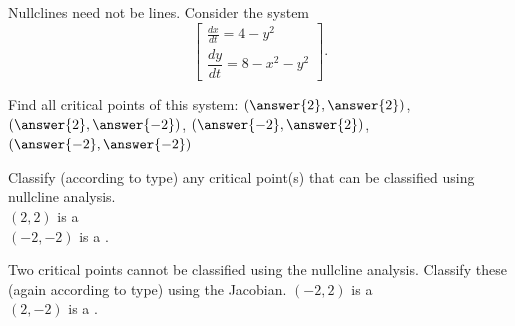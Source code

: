 \documentclass{ximera}
\begin{document}
\begin{exercise} Nullclines need not be lines. Consider the system
    \[
        \begin{bmatrix} 
            \displaystyle \frac{dx}{dt}=4-y^2\\ 
            \dfrac{dy}{dt}=8-x^2-y^2 
        \end{bmatrix}.
    \]
    
    Find all critical points of this system: $\left(\answer{2}, \answer{2}\right)$, $\left(\answer{2}, \answer{-2}\right)$, $\left(\answer{-2}, \answer{2}\right)$, $\left(\answer{-2}, \answer{-2}\right)$
    \begin{problem}
        Classify (according to type) any critical point(s) that can be classified using nullcline analysis.\\
        $(2,2)$ is a  \\
        $(-2, -2)$ is a .
        \begin{problem}
            Two critical points cannot be classified using the nullcline analysis. Classify these (again according to type) using the Jacobian. 
            $(-2, 2)$ is a   \\
            $(2, -2)$ is a   . 
        \end{problem}
    \end{problem}
\end{exercise}
%
\end{document}
